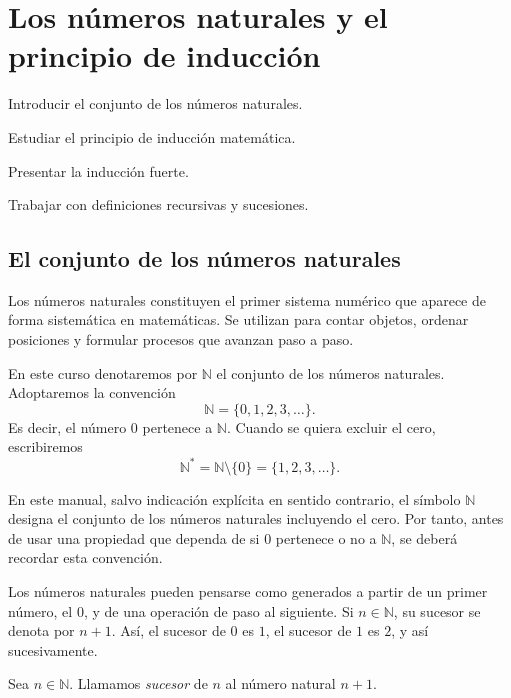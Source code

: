 \chapter{Los números naturales y el principio de inducción}

\begin{objetivos}
  \item Introducir el conjunto de los números naturales.
  \item Estudiar el principio de inducción matemática.
  \item Presentar la inducción fuerte.
  \item Trabajar con definiciones recursivas y sucesiones.
\end{objetivos}

\section{El conjunto de los números naturales}

Los números naturales constituyen el primer sistema numérico que aparece de forma sistemática en matemáticas. Se utilizan para contar objetos, ordenar posiciones y formular procesos que avanzan paso a paso.

En este curso denotaremos por \(\mathbb{N}\) el conjunto de los números naturales. Adoptaremos la convención
\[
  \mathbb{N}=\{0,1,2,3,\ldots\}.
\]
Es decir, el número \(0\) pertenece a \(\mathbb{N}\). Cuando se quiera excluir el cero, escribiremos
\[
  \mathbb{N}^{\ast}=\mathbb{N}\setminus\{0\}=\{1,2,3,\ldots\}.
\]

\begin{convencion}
En este manual, salvo indicación explícita en sentido contrario, el símbolo \(\mathbb{N}\) designa el conjunto de los números naturales incluyendo el cero. Por tanto, antes de usar una propiedad que dependa de si \(0\) pertenece o no a \(\mathbb{N}\), se deberá recordar esta convención.
\end{convencion}

Los números naturales pueden pensarse como generados a partir de un primer número, el \(0\), y de una operación de paso al siguiente. Si \(n\in\mathbb{N}\), su sucesor se denota por \(n+1\). Así, el sucesor de \(0\) es \(1\), el sucesor de \(1\) es \(2\), y así sucesivamente.

\begin{definicion}[Sucesor]
Sea \(n\in\mathbb{N}\). Llamamos \emph{sucesor} de \(n\) al número natural \(n+1\).
\end{definicion}

